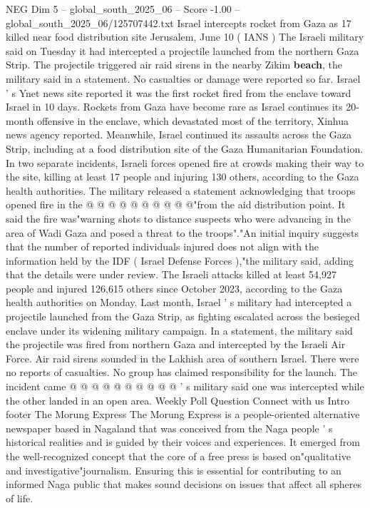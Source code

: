\begin{textsample}{NEG Dim 5 – global\_south\_2025\_06 – Score -1.00 – global\_south\_2025\_06/125707442.txt}  \label{ex:f5_neg_410}
Israel intercepts rocket from Gaza as 17 killed near food distribution site Jerusalem, June 10 ( IANS ) The Israeli military said on Tuesday it had intercepted a projectile launched from the northern Gaza Strip.
The projectile triggered air raid sirens in the nearby Zikim \textbf{beach}, the military said in a statement.
No casualties or damage were reported so far.
Israel ' s Ynet news site reported it was the first rocket fired from the enclave toward Israel in 10 days.
Rockets from Gaza have become rare as Israel continues its 20-month offensive in the enclave, which devastated most of the territory, Xinhua news agency reported.
Meanwhile, Israel continued its assaults across the Gaza Strip, including at a food distribution site of the Gaza Humanitarian Foundation.
In two separate incidents, Israeli forces opened fire at crowds making their way to the site, killing at least 17 people and injuring 130 others, according to the Gaza health authorities.
The military released a statement acknowledging that troops opened fire in the @ @ @ @ @ @ @ @ @ @"from the aid distribution point.
It said the fire was"warning shots to distance suspects who were advancing in the area of Wadi Gaza and posed a threat to the troops"."An initial inquiry suggests that the number of reported individuals injured does not align with the information held by the IDF ( Israel Defense Forces ),"the military said, adding that the details were under review.
The Israeli attacks killed at least 54,927 people and injured 126,615 others since October 2023, according to the Gaza health authorities on Monday.
Last month, Israel ' s military had intercepted a projectile launched from the Gaza Strip, as fighting escalated across the besieged enclave under its widening military campaign.
In a statement, the military said the projectile was fired from northern Gaza and intercepted by the Israeli Air Force.
Air raid sirens sounded in the Lakhish area of southern Israel.
There were no reports of casualties.
No group has claimed responsibility for the launch.
The incident came @ @ @ @ @ @ @ @ @ @ ' s military said one was intercepted while the other landed in an open area.
Weekly Poll Question Connect with us Intro footer The Morung Express The Morung Express is a people-oriented alternative newspaper based in Nagaland that was conceived from the Naga people ' s historical realities and is guided by their voices and experiences.
It emerged from the well-recognized concept that the core of a free press is based on"qualitative and investigative"journalism.
Ensuring this is essential for contributing to an informed Naga public that makes sound decisions on issues that affect all spheres of life.

\end{textsample}

